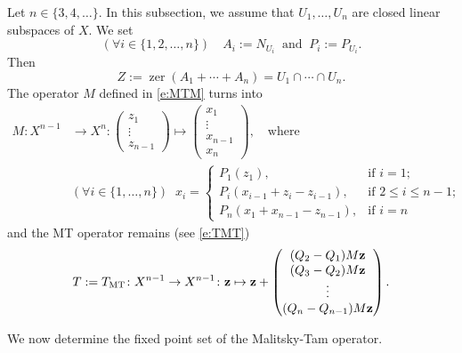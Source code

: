 \documentclass[11pt]{article}
\newcommand{\bz}{\ensuremath{\mathbf{z}}}
\newcommand{\zer}{\ensuremath{\operatorname{zer}}}
\newcommand{\tmt}{\ensuremath{T_{\text{\scriptsize MT}}}}
\theoremstyle{definition}
\providecommand{\zer}{\operatorname{zer}}
\begin{document}
{Let $n\in\{3,4,\ldots\}$. 
In this subsection, we assume that 
$U_1,\ldots,U_n$ are closed linear subspaces of $X$.
We set
\begin{equation*}
(\forall i\in\{1,2,\ldots,n\})
\quad 
A_i := N_{U_i} \;\;\text{and}\;\;
P_i := P_{U_i}. 
\end{equation*}
Then
\begin{equation*}
Z := \zer(A_1+\cdots+A_n) = U_1\cap \cdots \cap U_n.
\end{equation*}
The operator $M$ defined in \cref{e:MTM} turns into
\begin{subequations}
\label{e:linMTM}
\begin{align}
M\colon X^{n-1}
&\to 
X^n\colon
\begin{pmatrix}
z_1\\
\vdots\\
z_{n-1}
\end{pmatrix}
\mapsto
\begin{pmatrix}
x_1\\
\vdots\\
x_{n-1}\\
x_n
\end{pmatrix},
\quad\text{where}\;\;
\\[+2mm]
&(\forall i\in\{1,\ldots,n\})
\;\;
x_i = \begin{cases}
P_{1}(z_1), &\text{if $i=1$;}\\
P_{i}(x_{i-1}+z_i-z_{i-1}), &\text{if $2\leq i\leq n-1$;}\\
P_{n}(x_1+x_{n-1}-z_{n -1}), &\text{if $i=n$}
\end{cases}
\end{align}
\end{subequations}
and the MT operator remains (see \cref{e:TMT}) 
\begin{equation}
\label{e:linMT}
T := \tmt \colon X^{n-1}\to X^{n-1}\colon 
\bz\mapsto 
\bz+ 
\begin{pmatrix}
(Q_2-Q_1)M\bz\\
(Q_3-Q_2)M\bz\\
\vdots\\
(Q_n-Q_{n-1})M\bz
\end{pmatrix}. 
\end{equation}

We now determine the fixed point set of the Malitsky-Tam operator. 

}
\end{document}
